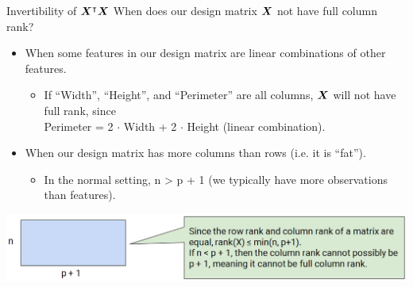 \documentclass[aspectratio=169]{../latex_main/tntbeamer}  %
\begin{document}
	
	\begin{frame}{Invertibility of  $\bm{X}^\intercal\bm{X}$ }
	    When does our design matrix    $\bm{X}$   not have full column rank?
	    \begin{itemize}
	        \item When some features in our design matrix are linear combinations of other features.
	        \begin{itemize}
	            \item If “Width”, “Height”, and “Perimeter” are all columns, $\bm{X}$ will not have full rank, since\\ Perimeter = 2 $\cdot$ Width + 2 $\cdot$ Height (linear combination).
	        \end{itemize}
	        \item  When our design matrix has more columns than rows (i.e. it is “fat”).
	        \begin{itemize}
	            \item In the normal setting, n > p + 1 (we typically have more observations than features). 
	        \end{itemize}
	    \end{itemize}
	    \centering
	    \includegraphics[scale=.35]{Bild16}
	\end{frame}
\end{document}
